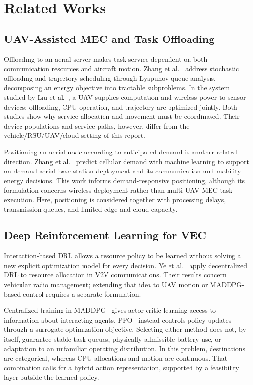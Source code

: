 \documentclass[journal]{IEEEtran}
\begin{document}
\iffalse
\section{Related Works}
\label{related_works}
\subsection{UAV-Assisted MEC and Task Offloading}
Offloading to an aerial server makes task service dependent on both communication resources and aircraft motion. Zhang et al.\ \cite{zhang2019mobile} address stochastic offloading and trajectory scheduling through Lyapunov queue analysis, decomposing an energy objective into tractable subproblems. In the system studied by Liu et al.\ \cite{liu2020uav}, a UAV supplies computation and wireless power to sensor devices; offloading, CPU operation, and trajectory are optimized jointly. Both studies show why service allocation and movement must be coordinated. Their device populations and service paths, however, differ from the vehicle/RSU/UAV/cloud setting of this report.

Positioning an aerial node according to anticipated demand is another related direction. Zhang et al.\ \cite{zhang2020uav} predict cellular demand with machine learning to support on-demand aerial base-station deployment and its communication and mobility energy decisions. This work informs demand-responsive positioning, although its formulation concerns wireless deployment rather than multi-UAV MEC task execution. Here, positioning is considered together with processing delays, transmission queues, and limited edge and cloud capacity.

\subsection{Deep Reinforcement Learning for VEC}
Interaction-based DRL allows a resource policy to be learned without solving a new explicit optimization model for every decision. Ye et al.\ \cite{ye2021deep} apply decentralized DRL to resource allocation in V2V communications. Their results concern vehicular radio management; extending that idea to UAV motion or MADDPG-based control requires a separate formulation.

Centralized training in MADDPG~\cite{lowe2017multi} gives actor-critic learning access to information about interacting agents. PPO~\cite{schulman2017proximal} instead controls policy updates through a surrogate optimization objective. Selecting either method does not, by itself, guarantee stable task queues, physically admissible battery use, or adaptation to an unfamiliar operating distribution. In this problem, destinations are categorical, whereas CPU allocations and motion are continuous. That combination calls for a hybrid action representation, supported by a feasibility layer outside the learned policy.
\end{document}
